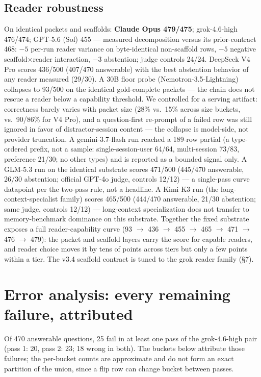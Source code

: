 \documentclass[11pt]{article}
\begin{document}
\subsection{Reader robustness}
On identical packets and scaffolds: \textbf{Claude Opus 479/475}; grok-4.6-high 476/474; GPT-5.6 (Sol)
455 --- measured decomposition versus its prior-contract 468: $-5$ per-run
reader variance on byte-identical non-scaffold rows, $-5$ negative
scaffold$\times$reader interaction, $-3$ abstention; judge controls 24/24.
DeepSeek V4 Pro scores 436/500 (407/470 answerable) with the best abstention
behavior of any reader measured (29/30). A 30B floor probe
(Nemotron-3.5-Lightning) collapses to 93/500 on the identical gold-complete
packets --- the chain does not rescue a reader below a capability threshold.
We controlled for a serving artifact: correctness barely varies with packet
size (28\% vs.\ 15\% across size buckets, vs.\ 90/86\% for V4 Pro), and a
question-first re-prompt of a failed row was still ignored in favor of
distractor-session content --- the collapse is model-side, not provider
truncation.
A gemini-3.7-flash run reached a 189-row partial (a type-ordered prefix, not a
sample: single-session-user 64/64, multi-session 73/83, preference 21/30; no
other types) and is reported as a bounded signal only. A GLM-5.3 run on the
identical substrate scores 471/500 (445/470 answerable, 26/30 abstention;
official GPT-4o judge, controls 12/12) --- a single-pass curve datapoint per
the two-pass rule, not a headline. A Kimi K3 run (the long-context-specialist
family) scores 465/500 (444/470 answerable, 21/30 abstention; same judge,
controls 12/12) --- long-context specialization does not transfer to
memory-benchmark dominance on this substrate. Together the fixed
substrate exposes a full reader-capability curve
(93 $\to$ 436 $\to$ 455 $\to$ 465 $\to$ 471 $\to$ 476 $\to$ 479): the packet and scaffold layers carry the
score for capable readers, and reader choice moves it by tens of points across
tiers but only a few points within a tier. The v3.4 scaffold contract is tuned
to the grok reader family (\S7).

\section{Error analysis: every remaining failure, attributed}
Of 470 answerable questions, 25 fail in at least one pass of the grok-4.6-high
pair (pass 1: 20, pass 2: 23; 18 wrong in both). The buckets below attribute
those failures; the per-bucket counts are approximate and do not form an exact
partition of the union, since a flip row can change bucket between passes.
\end{document}
